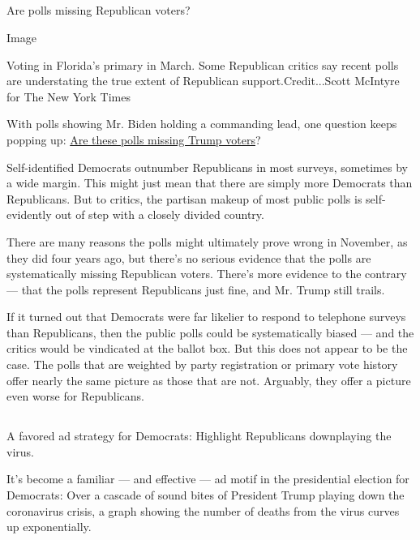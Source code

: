 \hypertarget{-7}{%
\subsection{}\label{-7}}

Are polls missing Republican voters?

Image

Voting in Florida's primary in March. Some Republican critics say recent
polls are understating the true extent of Republican
support.Credit...Scott McIntyre for The New York Times

With polls showing Mr. Biden holding a commanding lead, one question
keeps popping up:
\href{https://www.nytimes3xbfgragh.onion/2020/07/29/upshot/polls-political-party-republicans.html}{Are
these polls missing Trump voters}?

Self-identified Democrats outnumber Republicans in most surveys,
sometimes by a wide margin. This might just mean that there are simply
more Democrats than Republicans. But to critics, the partisan makeup of
most public polls is self-evidently out of step with a closely divided
country.

There are many reasons the polls might ultimately prove wrong in
November, as they did four years ago, but there's no serious evidence
that the polls are systematically missing Republican voters. There's
more evidence to the contrary --- that the polls represent Republicans
just fine, and Mr. Trump still trails.

If it turned out that Democrats were far likelier to respond to
telephone surveys than Republicans, then the public polls could be
systematically biased --- and the critics would be vindicated at the
ballot box. But this does not appear to be the case. The polls that are
weighted by party registration or primary vote history offer nearly the
same picture as those that are not. Arguably, they offer a picture even
worse for Republicans.

\hypertarget{-8}{%
\subsection{}\label{-8}}

A favored ad strategy for Democrats: Highlight Republicans downplaying
the virus.

It's become a familiar --- and effective --- ad motif in the
presidential election for Democrats: Over a cascade of sound bites of
President Trump playing down the coronavirus crisis, a graph showing the
number of deaths from the virus curves up exponentially.

